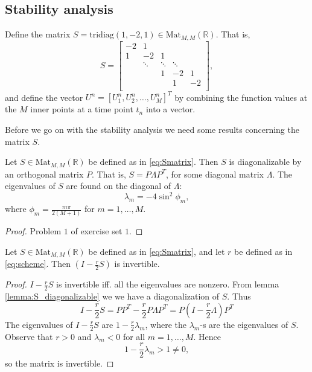 \subsection{Stability analysis}

Define the matrix \( S = \text{tridiag}(1, -2, 1) \in \text{Mat}_{M,M}(\mathbb{R}) \).
That is,
\begin{equation}
  \label{eq:Smatrix}
  S = 
  \begin{bmatrix}
    -2 & 1 &  &  & \\
    1& -2 & 1 &  & \\
     & \ddots & \ddots & \ddots & \\
     &  & 1 & -2 & 1\\
     &  &  & 1 & -2\\
  \end{bmatrix},
\end{equation}
and define the vector \( U^n = [U_1^n, U_2^n, \dots, U_M^n]^T \)
by combining the function values at the \( M \) inner points
at a time point \( t_n \) into a vector.

Before we go on with the stability analysis we need some results
concerning the matrix \( S \).

\begin{lemma}
  \label{lemma:S_diagonalizable}
  Let \( S \in \text{Mat}_{M,M}(\mathbb{R}) \) be defined as in \eqref{eq:Smatrix}.
  Then \( S \) is diagonalizable by an orthogonal matrix \( P \).
  That is, \( S = P \Lambda P^T \), for some diagonal matrix \( \Lambda \).
  The eigenvalues of \( S \) are found on the diagonal of \( \Lambda \):
  \[
    \lambda_m = - 4 \sin^2 \phi_m,
  \]
  where \( \phi_m = \frac{m \pi}{2(M+1)} \) for \(m = 1, \dots, M. \)
\end{lemma}
\begin{proof}
    Problem \( 1 \) of exercise set \( 1 \).
\end{proof}

\begin{lemma}
  \label{lemma:existance_of_inverse}
Let \( S \in \text{Mat}_{M,M}(\mathbb{R}) \) be defined as in \eqref{eq:Smatrix},
and let \( r \) be defined as in \eqref{eq:scheme}.
  Then \( \left(I - \frac{r}{2} S\right)\) is invertible.
\end{lemma}
\begin{proof}
  \( I - \frac{r}{2} S \) is invertible iff. all the eigenvalues are nonzero.
  From lemma \ref{lemma:S_diagonalizable} we we have a diagonalization of \( S \). Thus
  \begin{equation*}
      I - \frac{r}{2} S
      = PP^T - \frac{r}{2} P\Lambda P^T
      = P \left(I - \frac{r}{2} \Lambda \right) P^T
  \end{equation*}
  The eigenvalues of \( I - \frac{r}{2}S \) are
  \( 1 - \frac{r}{2} \lambda_m\),
  where the \( \lambda_m \)-s are the eigenvalues of \( S \).
  Observe that \( r > 0 \) and \( \lambda_m < 0 \) for all \( m = 1, \dots, M \).
  Hence
  \[
    1 - \frac{r}{2} \lambda_m > 1 \neq 0,
  \]
  so the matrix is invertible.
\end{proof}

